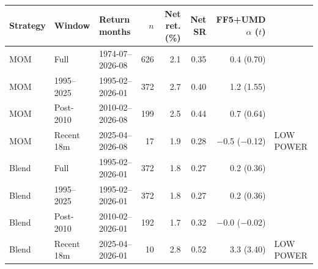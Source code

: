 \begin{tabular}{lllrrrrl}
\toprule
Strategy & Window & Return months & $n$ & Net ret. (\%) & Net SR & FF5+UMD $\alpha$ ($t$) &  \\
\midrule
MOM & Full & 1974-07--2026-08 & 626 & 2.1 & 0.35 & 0.4 (0.70) &  \\
MOM & 1995--2025 & 1995-02--2026-01 & 372 & 2.7 & 0.40 & 1.2 (1.55) &  \\
MOM & Post-2010 & 2010-02--2026-08 & 199 & 2.5 & 0.44 & 0.7 (0.64) &  \\
MOM & Recent 18m & 2025-04--2026-08 & 17 & 1.9 & 0.28 & $-$0.5 ($-$0.12) & LOW POWER \\
Blend & Full & 1995-02--2026-01 & 372 & 1.8 & 0.27 & 0.2 (0.36) &  \\
Blend & 1995--2025 & 1995-02--2026-01 & 372 & 1.8 & 0.27 & 0.2 (0.36) &  \\
Blend & Post-2010 & 2010-02--2026-01 & 192 & 1.7 & 0.32 & $-$0.0 ($-$0.02) &  \\
Blend & Recent 18m & 2025-04--2026-01 & 10 & 2.8 & 0.52 & 3.3 (3.40) & LOW POWER \\
\bottomrule
\end{tabular}
